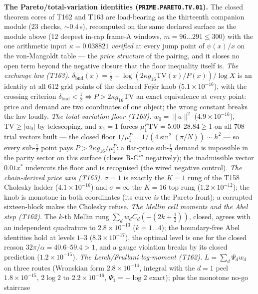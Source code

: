 \documentclass[11pt,a4paper]{article}
\theoremstyle{definition}
\begin{document}
\par\smallskip\noindent\textbf{The Pareto/total-variation identities
(\texttt{PRIME.PARETO.TV.01}).}
The closed theorem cores of T162 and T163 are load-bearing as the
thirteenth companion module ($23$ checks, ${\sim}0.4$\,s), recomputed on
the same declared surface as the module above ($12$ deepest in-cap
frame-A windows, $m=96\ldots291\le300$) with the one arithmetic input
$\kappa=0.038821$ \emph{verified} at every jump point of $\psi(x)/x$ on
the von-Mangoldt table --- the \emph{price structure} of the pairing,
and it closes no open term beyond the negative closure that the floor
inequality itself is.
\emph{The exchange law (T163).}
$\delta_{\mathrm{bnd}}(x)=\tfrac12+\log(2\kappa g_{16}\mathrm{TV}(x)/P(x))/\log X$
is an identity at all $612$ grid points of the declared Fej\'er knob
($5.1\times10^{-16}$), with the crossing criterion
$\delta_{\mathrm{bnd}}<\tfrac12\iff P>2\kappa g_{16}\mathrm{TV}$ an exact
equivalence at every point: price and demand are two coordinates of one
object; the wrong constant breaks the law loudly.
\emph{The total-variation floor (T163).} $w_0=\|a\|^2$
($4.9\times10^{-16}$), $\mathrm{TV}\ge|w_0|$ by telescoping, and
$x_1=1$ forces $\mu^P_1\mathrm{TV}=5.00$--$28.84\ge1$ on all $708$ trial
vectors built --- the closed floor
$1/\mu^P_1=1/(4\sin^2(\pi/N))\sim h^2$ --- so every sub-$\tfrac12$ point
pays $P>2\kappa g_{16}/\mu^P_1$: a flat-price sub-$\tfrac12$ demand is
impossible in the parity sector on this surface (closes R-C$'''$
negatively); the inadmissible vector $0.01x^*$ undercuts the floor and
is recognised (the wired negative control).
\emph{The chain-derived price axis (T163).} $\sigma=1$ is exactly the
$K=1$ rung of the T158 Cholesky ladder ($4.1\times10^{-16}$) and
$\sigma=\infty$ the $K=16$ top rung ($1.2\times10^{-12}$); the knob is
monotone in both coordinates (its curve \emph{is} the Pareto front); a
corrupted sixteen-block makes the Cholesky refuse.
\emph{The Mellin cell moments and the Abel step (T162).} The $k$-th
Mellin rung $\sum_dw_dC_d(-(2k+\tfrac12))$, closed, agrees with an
independent quadrature to $2.8\times10^{-13}$ ($k=1\ldots4$); the
boundary-free Abel identities hold at levels $1$--$3$
($8.3\times10^{-17}$), the optimal level is one for the closed reason
$32\pi/\alpha=40.6$--$59.4>1$, and a gauge violation breaks by its
closed prediction ($1.2\times10^{-15}$).
\emph{The Lerch/Frullani log-moment (T162).} $L=\sum_d\Psi_dw_d$ on
three routes (Wronskian form $2.8\times10^{-14}$, integral with the
$d=1$ peel $1.8\times10^{-15}$, $2\log2$ to $2.2\times10^{-16}$,
$\Psi_1=-\log2$ exact); plus the monotone no-go staircase
\end{document}
